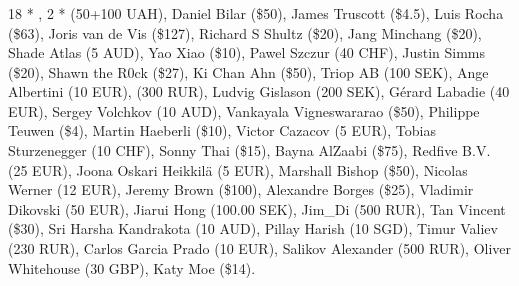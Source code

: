\subsubsection*{}

18 * , 
2 *  (50+100 UAH), 
Daniel Bilar (\$50), 
James Truscott (\$4.5),
Luis Rocha (\$63), 
Joris van de Vis (\$127), 
Richard S Shultz (\$20), 
Jang Minchang (\$20), 
Shade Atlas (5 AUD), 
Yao Xiao (\$10),
Pawel Szczur (40 CHF), 
Justin Simms (\$20), 
Shawn the R0ck (\$27), 
Ki Chan Ahn (\$50), 
Triop AB (100 SEK), 
Ange Albertini (10 EUR),
 (300 RUR), 
Ludvig Gislason (200 SEK), 
Gérard Labadie (40 EUR), 
Sergey Volchkov (10 AUD),
Vankayala Vigneswararao (\$50),
Philippe Teuwen (\$4),
Martin Haeberli (\$10),
Victor Cazacov (5 EUR),
Tobias Sturzenegger (10 CHF),
Sonny Thai (\$15),
Bayna AlZaabi (\$75),
Redfive B.V. (25 EUR),
Joona Oskari Heikkilä (5 EUR),
Marshall Bishop (\$50),
Nicolas Werner (12 EUR),
Jeremy Brown (\$100),
Alexandre Borges (\$25),
Vladimir Dikovski (50 EUR),
Jiarui Hong (100.00 SEK),
Jim\_Di (500 RUR),
Tan Vincent (\$30),
Sri Harsha Kandrakota (10 AUD),
Pillay Harish (10 SGD),
Timur Valiev (230 RUR),
Carlos Garcia Prado (10 EUR),
Salikov Alexander (500 RUR),
Oliver Whitehouse (30 GBP),
Katy Moe (\$14).

